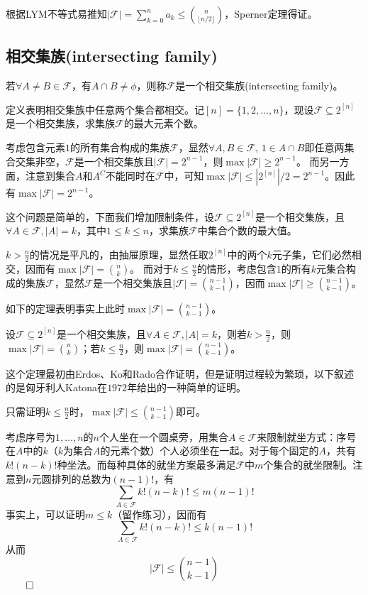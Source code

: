 ﻿\documentclass[11pt]{article}
\newtheorem{theorem}{{\hskip 1.7em \bf 定理}}
\newtheorem{definition}[theorem]{\hskip 1.7em 定义}
\renewenvironment{proof}{{\noindent\hskip 2em \bf 证明 \quad}}{\hfill$\qed$\par}
\begin{document}
    根据LYM不等式易推知$|\mathcal{F}|=\sum_{k=0}^n a_k\leq \binom{n}{\lfloor n/2\rfloor}$，Sperner定理得证。

    \subsection{相交集族(intersecting family)}
    \begin{definition}[相交集族]
        若$\forall A\ne B\in \mathcal{F}$，有$A\cap B\ne \phi$，则称$\mathcal{F}$是一个相交集族(intersecting family)。
    \end{definition}

    定义表明相交集族中任意两个集合都相交。记$[n]=\{1, 2,\dots , n\}$，现设$\mathcal{F}\subseteq 2^{[n]}$是一个相交集族，求集族$\mathcal{F}$的最大元素个数。

    考虑包含元素$1$的所有集合构成的集族$\mathcal{F}$，显然$\forall A,B\in \mathcal{F}$, $1\in A\cap B$即任意两集合交集非空，$\mathcal{F}$是一个相交集族且$|\mathcal{F}|=2^{n-1}$，则$\max |\mathcal{F}|\ge 2^{n-1}$。 而另一方面，注意到集合$A$和$A^C$不能同时在$\mathcal{F}$中，可知$\max |\mathcal{F}|\leq|2^{[n]}|/2= 2^{n-1}$。因此有$\max |\mathcal{F}|= 2^{n-1}$。

    这个问题是简单的，下面我们增加限制条件，设$\mathcal{F}\subseteq 2^{[n]}$是一个相交集族，且$\forall A\in \mathcal{F}, |A|=k$，其中$1\le k\le n$，求集族$\mathcal{F}$中集合个数的最大值。

    $k>\frac{n}{2}$的情况是平凡的，由抽屉原理，显然任取$2^{[n]}$中的两个$k$元子集，它们必然相交，因而有$\max |\mathcal{F}|= {n\choose k}$。
    而对于$k\le \frac{n}{2}$的情形，考虑包含$1$的所有$k$元集合构成的集族$\mathcal{F}$，显然$\mathcal{F}$是一个相交集族且$|\mathcal{F}|={{n-1}\choose {k-1}}$，因而$\max |\mathcal{F}|\ge {{n-1}\choose {k-1}}$。

    如下的定理表明事实上此时$\max |\mathcal{F}|= {{n-1}\choose {k-1}}$。

    \begin{theorem}
        设$\mathcal{F}\subseteq 2^{[n]}$是一个相交集族，且$\forall A\in \mathcal{F}, |A|=k$，则若$k>\frac{n}{2}$，则$\max |\mathcal{F}|= {n\choose k}$；若$k\le \frac{n}{2}$，则$\max |\mathcal{F}|= {{n-1}\choose {k-1}}$。
    \end{theorem}

    这个定理最初由Erdos、Ko和Rado合作证明，但是证明过程较为繁琐，以下叙述的是匈牙利人Katona在$1972$年给出的一种简单的证明。

    \begin{proof}{(Katona, 1972)}
        只需证明$k\le \frac{n}{2}$时，$\max |\mathcal{F}|\le {{n-1}\choose {k-1}}$即可。

        考虑序号为$1,\ldots,n$的$n$个人坐在一个圆桌旁，用集合$A\in \mathcal{F}$来限制就坐方式：序号在$A$中的$k$（$k$为集合$A$的元素个数）个人必须坐在一起。对于每个固定的$A$，共有$k!(n-k)!$种坐法。而每种具体的就坐方案最多满足$\mathcal{F}$中$m$个集合的就坐限制。注意到$n$元圆排列的总数为$(n-1)!$，有
        \[
            \sum_{A\in \mathcal{F}}k!(n-k)!\le m(n-1)!
        \]
        事实上，可以证明$m\le k$（留作练习），因而有
        \[
            \sum_{A\in \mathcal{F}}k!(n-k)!\le k(n-1)!
        \]
        从而
        \[
            |\mathcal{F}|\le {{n-1}\choose {k-1}}
        \]
    \end{proof}
\end{document}
